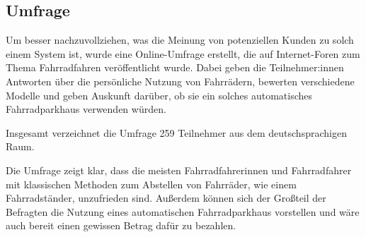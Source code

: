 \subsection{Umfrage}
Um besser nachzuvollziehen, was die Meinung von potenziellen Kunden zu solch einem System ist, wurde eine Online-Umfrage erstellt, die auf Internet-Foren zum Thema Fahrradfahren veröffentlicht wurde. Dabei geben die Teilnehmer:innen Antworten über die persönliche Nutzung von Fahrrädern, bewerten verschiedene Modelle und geben Auskunft darüber, ob sie ein solches automatisches Fahrradparkhaus verwenden würden.

\noindent Insgesamt verzeichnet die Umfrage 259 Teilnehmer aus dem deutschsprachigen Raum.

\noindent Die Umfrage zeigt klar, dass die meisten Fahrradfahrerinnen und Fahrradfahrer mit klassischen Methoden zum Abstellen von Fahrräder, wie einem Fahrradständer, unzufrieden sind. Außerdem können sich der Großteil der Befragten die Nutzung eines automatischen Fahrradparkhaus vorstellen und wäre auch bereit einen gewissen Betrag dafür zu bezahlen.
